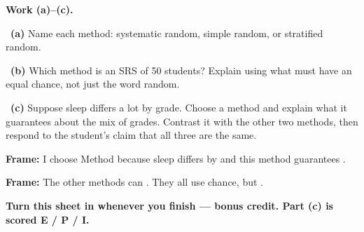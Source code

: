 \documentclass[11pt]{article}
\begin{document}
\newpage
\textbf{Work (a)--(c).}\par\smallskip

~\textbf{(a)} Name each method: systematic random, simple random, or stratified random.\par
\workspace{0.7in}

~\textbf{(b)} Which method is an SRS of 50 students? Explain using what must have an equal chance, not just the word random.\par
\workspace{1.4in}

~\textbf{(c)} Suppose sleep differs a lot by grade. Choose a method and explain what it guarantees about the mix of grades. Contrast it with the other two methods, then respond to the student's claim that all three are the same.\par
\workspace{2.0in}

\begin{sentenceframebox}\raggedright\textbf{Frame:} I choose Method \blank[0.4in] because sleep differs by \blank[0.8in] and this method guarantees \blank[1.7in].\end{sentenceframebox}

\begin{sentenceframebox}\raggedright\textbf{Frame:} The other methods can \blank[1.8in]. They all use chance, but \blank[2in].\end{sentenceframebox}

\textbf{Turn this sheet in whenever you finish --- bonus credit. Part (c) is scored E / P / I.}\par
\end{document}
